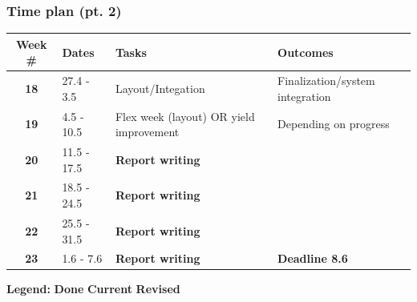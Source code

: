 \documentclass[t, screen, aspectratio=43]{beamer}
\begin{document}
\begin{frame}
	\frametitle{Time plan (pt. 2)}
	\begin{table}[htb!]
		\tiny
		\centering
		\vspace{-1em}
		\def\arraystretch{1.5}		
		\setlength\arrayrulewidth{0.75pt}
		\setlength{\tabcolsep}{1em} %
		\begin{tabular}{|c|l|l|l|}
			\hline 
			\rule[-1ex]{0pt}{2.5ex}\cellcolor{gray!40}\textbf{Week \#} & \cellcolor{gray!40}\textbf{Dates} &\cellcolor{gray!40}\textbf{Tasks} & \cellcolor{gray!40}\textbf{Outcomes}\\ 
			\hline 
			\rule[-1ex]{0pt}{2.5ex}\textbf{18}& 27.4 - 3.5 & Layout/Integation & Finalization/system integration\\ 
			\hline 
			\rule[-1ex]{0pt}{2.5ex}\textbf{19}& 4.5 - 10.5 & Flex week (layout) OR yield improvement & Depending on progress\\
			\hline 
			\rule[-1ex]{0pt}{2.5ex}\textbf{20}& 11.5 - 17.5 & {\color{blue}\textbf{Report writing}} & \\ 
			\hline 
			\rule[-1ex]{0pt}{2.5ex}\textbf{21}& 18.5 - 24.5& {\color{blue}\textbf{Report writing}} & \\ 
			\hline 
			\rule[-1ex]{0pt}{2.5ex}\textbf{22}& 25.5 - 31.5& {\color{blue}\textbf{Report writing}} & \\ 
			\hline 
			\rule[-1ex]{0pt}{2.5ex}\textbf{23}& 1.6 - 7.6& {\color{blue}\textbf{Report writing}} & {\color{red}\textbf{Deadline 8.6}}\\ 
			\hline 
		\end{tabular}
		\begin{flushleft}\textbf{Legend:} \colorbox{red!20}{\textbf{Done}} \colorbox{green!20}{\textbf{Current}}  \colorbox{blue!20}{\textbf{Revised}}
		\end{flushleft}
	\end{table}   
\end{frame}



\end{document}
